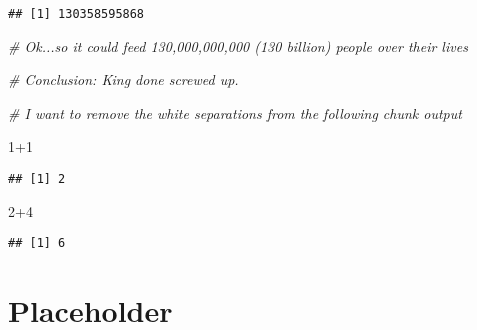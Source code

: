 \documentclass[]{book}
\newenvironment{Shaded}{\begin{snugshade}}{\end{snugshade}}
\newcommand{\DecValTok}[1]{\textcolor[rgb]{0.00,0.00,0.81}{{#1}}}
\newcommand{\CommentTok}[1]{\textcolor[rgb]{0.56,0.35,0.01}{\textit{{#1}}}}
\begin{document}
\begin{verbatim}
## [1] 130358595868
\end{verbatim}

\begin{Shaded}
\begin{Highlighting}[]
\CommentTok{# Ok...so it could feed 130,000,000,000 (130 billion) people over their lives}

\CommentTok{# Conclusion: King done screwed up.}
\end{Highlighting}
\end{Shaded}

\begin{Shaded}
\begin{Highlighting}[]
\CommentTok{# I want to remove the white separations from the following chunk output}

\DecValTok{1+1}
\end{Highlighting}
\end{Shaded}

\begin{verbatim}
## [1] 2
\end{verbatim}

\begin{Shaded}
\begin{Highlighting}[]
\DecValTok{2+4}
\end{Highlighting}
\end{Shaded}

\begin{verbatim}
## [1] 6
\end{verbatim}

\chapter{Placeholder}\label{placeholder}


\end{document}
